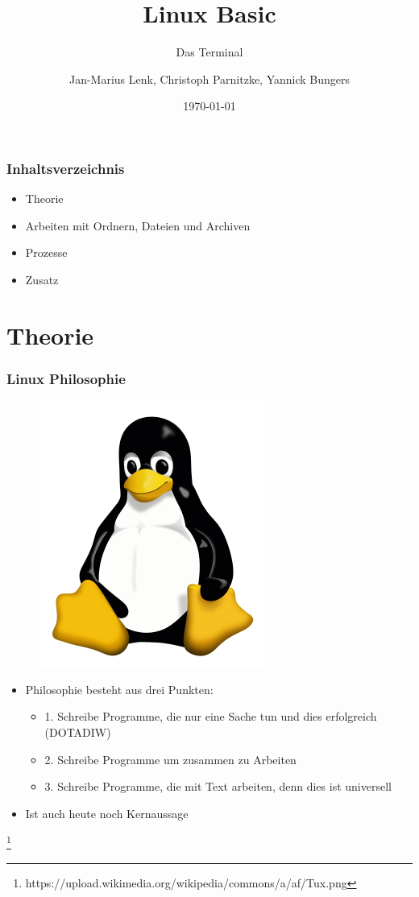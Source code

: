 \documentclass[12pt,utf8]{beamer}
\title{Linux Basic}
\subtitle{Das Terminal}
\author[J.-M. Lenk, C. Parnitzke, Y. Bungers]{Jan-Marius Lenk, Christoph Parnitzke, Yannick Bungers}
\institute[FOSS AG]{Free and Open Source Software AG\\ Fakultät für Informatik}
\date{\today}
\begin{document}
\titlepage

\begin{frame}
\frametitle{Inhaltsverzeichnis}
\begin{itemize}
	\item Theorie
	\item Arbeiten mit Ordnern, Dateien und Archiven
	\item Prozesse
	\item Zusatz
\end{itemize}
\end{frame}

\section{Theorie}
\begin{frame}
\frametitle{Linux Philosophie}
\begin{figure}
\includegraphics[scale=0.3]{res/tux.png}
\end{figure}
\begin{itemize}
	\item Philosophie besteht aus drei Punkten:
	\begin{itemize}
		\item 1. Schreibe Programme, die nur eine Sache tun und dies erfolgreich (DOTADIW)
		\item 2. Schreibe Programme um zusammen zu Arbeiten
		\item 3. Schreibe Programme, die mit Text arbeiten, denn dies ist universell
	\end{itemize}
	\item Ist auch heute noch Kernaussage
\end{itemize}
\footnote{https://upload.wikimedia.org/wikipedia/commons/a/af/Tux.png}
\end{frame}
\end{document}
